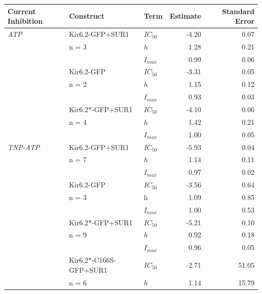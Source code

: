 \documentclass[10pt,lineno, doublespacing]{elife_modified}
\begin{document}
\begin{table}
\centering\begingroup
\begin{tabular}{p{32mm} l l r r}
\toprule
\textbf{Current Inhibition} & Construct & Term & Estimate & Standard Error\\
\midrule
\textit{ATP} & Kir6.2-GFP+SUR1            & $IC_{50}$ & -4.20 & 0.07\\
             & n = 3                      & $h$       & 1.28  & 0.21\\
             &                            & $I_{max}$ & 0.99  & 0.06\\
\cmidrule{2-5}
             & Kir6.2-GFP                 & $IC_{50}$ & -3.31 & 0.05\\
             & n = 2                      & $h$       & 1.15  & 0.12\\
             &                            & $I_{max}$ & 0.93  & 0.03\\
\cmidrule{2-5}
             & Kir6.2*-GFP+SUR1           & $IC_{50}$ & -4.10 & 0.06\\
             & n = 4                      & $h$       & 1.42  & 0.21\\
             &                            & $I_{max}$ & 1.00  & 0.05\\
\cmidrule{2-5}
\textit{TNP-ATP} & Kir6.2-GFP+SUR1        & $IC_{50}$ & -5.93 & 0.04\\
                 & n = 7                  & $h$       & 1.14  & 0.11\\
                 &                        & $I_{max}$ & 0.97  & 0.02\\
\cmidrule{2-5}
                 & Kir6.2-GFP             & $IC_{50}$ & -3.56 & 0.64\\
                 & n = 3                  & h         & 1.09  & 0.85\\
                 &                        & $I_{max}$ & 1.00  & 0.53\\
\cmidrule{2-5}
                 & Kir6.2*-GFP+SUR1       & $IC_{50}$ & -5.21 & 0.10\\
                 & n = 9                  & $h$       & 0.92  & 0.18\\
                 &                        & $I_{max}$ & 0.96  & 0.05\\
\cmidrule{2-5}
                 & Kir6.2*-C166S-GFP+SUR1 & $IC_{50}$ & -2.71 & 51.05\\
                 & n = 6                  & $h$       & 1.14  & 15.79\\

\end{tabular}
\end{table}
\end{document}
